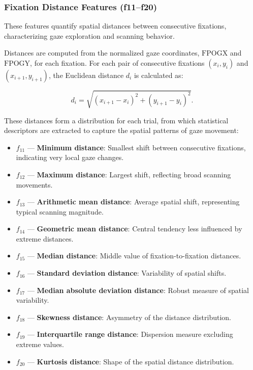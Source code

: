 \documentclass{article}
\begin{document}
\subsubsection{Fixation Distance Features (f11–f20)}

These features quantify spatial distances between consecutive fixations, characterizing gaze exploration and scanning behavior.  

Distances are computed from the normalized gaze coordinates, \(\mathrm{FPOGX}\) and \(\mathrm{FPOGY}\), for each fixation. 
For each pair of consecutive fixations \((x_i, y_i)\) and \((x_{i+1}, y_{i+1})\), the Euclidean distance \(d_i\) is calculated as:

\[
d_i = \sqrt{(x_{i+1} - x_i)^2 + (y_{i+1} - y_i)^2}.
\]

These distances form a distribution for each trial, from which statistical descriptors are extracted to capture the spatial patterns of gaze movement:

\begin{itemize}
    \item \(f_{11}\) — \textbf{Minimum distance}: Smallest shift between consecutive fixations, indicating very local gaze changes.
    \item \(f_{12}\) — \textbf{Maximum distance}: Largest shift, reflecting broad scanning movements.
    \item \(f_{13}\) — \textbf{Arithmetic mean distance}: Average spatial shift, representing typical scanning magnitude.
    \item \(f_{14}\) — \textbf{Geometric mean distance}: Central tendency less influenced by extreme distances.
    \item \(f_{15}\) — \textbf{Median distance}: Middle value of fixation-to-fixation distances.
    \item \(f_{16}\) — \textbf{Standard deviation distance}: Variability of spatial shifts.
    \item \(f_{17}\) — \textbf{Median absolute deviation distance}: Robust measure of spatial variability.
    \item \(f_{18}\) — \textbf{Skewness distance}: Asymmetry of the distance distribution.
    \item \(f_{19}\) — \textbf{Interquartile range distance}: Dispersion measure excluding extreme values.
    \item \(f_{20}\) — \textbf{Kurtosis distance}: Shape of the spatial distance distribution.
\end{itemize}
\end{document}
